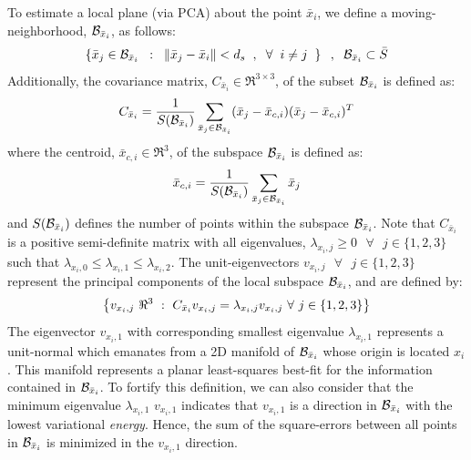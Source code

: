 		To estimate a local plane (via PCA) about the point $\bar{x}_{i}$, we define a moving-neighborhood, ${\cal B}_{\bar{x}_{i}}$, as follows:
			\newcommand{\xball}{\mmathcal{B}_{\bar{x}_{i}}}
			\begin{equation}
				\setwrap{ \bar{x}_{j} \in \xball \SSep : \SSep \norm{\bar{x}_{j}-\bar{x}_{i}} < d_{s}\SSep , \SSep \forall \SSep i\neq j \SSep }\SSep,\SSep \xball \subset \bar{S}
				\label{eq::pca_ball}
			\end{equation}
		Additionally, the covariance matrix, $C_{\bar{x}_{i}} \in \Re^{3\times3}$, of the subset $\xball$ is defined as:
			\begin{equation}
				C_{\bar{x}_{i}} =
				\frac{1}{S(\xball)} \sum_{\bar{x}_{j} \in \xball } ( \bar{x}_{j} - \bar{x}_{c,i} ) ( \bar{x}_{j} - \bar{x}_{c,i} )^{T}
				\label{eq::pca_cov}
			\end{equation}
		where the centroid, $\bar{x}_{c,i} \in \Re^{3}$, of the subspace $\xball$ is defined as:
			\begin{equation}
				\bar{x}_{c,i} = 
				\frac{1}{S(\xball)} \sum_{\bar{x}_{j} \in \xball } \bar{x}_{j}
				\label{eq::pca_centroid}
			\end{equation}
		and $S(\xball)$ defines the number of points within the subspace $\xball$. Note that $C_{\bar{x}_{i}}$ is a positive semi-definite matrix with all eigenvalues, $\lambda_{x_{i},j}\geq0\text{ }\forall\text{ }j\in\{1,2,3\}$ such that $\lambda_{x_{i},0}\leq\lambda_{x_{i},1}\leq\lambda_{x_{i},2}$. The unit-eigenvectors $v_{x_{i},j} \text{ }\forall\text{ }j\in\{1,2,3\}$ represent the principal components of the local subspace $\xball$, and are defined by:
			\begin{equation}
				\left\{ v_{x_{i},j}\text{ }\Re^{3}\text{ }:\text{ }C_{\bar{x}_{i}} v_{x_{i},j} = \lambda_{x_{i},j} v_{x_{i},j}\text{ }\forall\text{ }j\in\{1,2,3\}\right\}
				\label{eq::pca_eigen}
			\end{equation}
		The eigenvector $v_{x_{i},1}$ with corresponding smallest eigenvalue $\lambda_{x_{i},1}$ represents a unit-normal which emanates from a 2D manifold of $\xball$ whose origin is located $x_{i}$. This manifold represents a planar least-squares best-fit for the information contained in $\xball$. To fortify this definition, we can also consider that the minimum eigenvalue $\lambda_{x_{i},1}$ $v_{x_{i},1}$ indicates that $v_{x_{i},1}$ is a direction in $\xball$ with the lowest variational \emph{energy}. Hence, the sum of the square-errors between all points in $\xball$ is minimized in the $v_{x_{i},1}$ direction.

